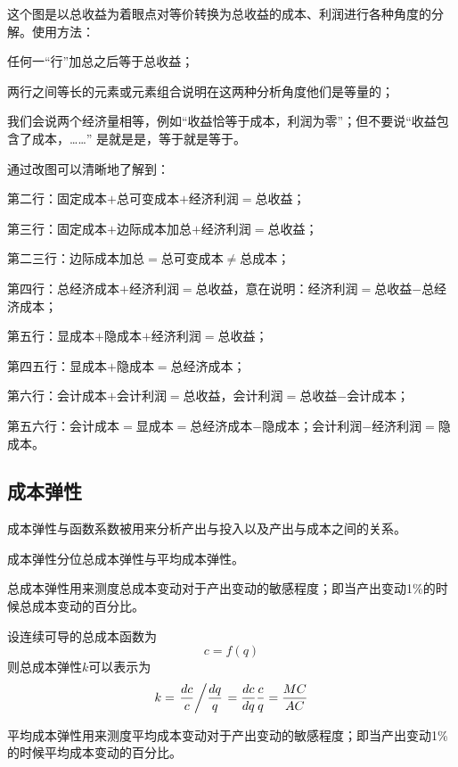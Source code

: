 这个图是以总收益为着眼点对等价转换为总收益的成本、利润进行各种角度的分解。使用方法：
\begin{compactitem}
\item 任何一“行”加总之后等于总收益；
\item 两行之间等长的元素或元素组合说明在这两种分析角度他们是等量的；
\item 我们会说两个经济量相等，例如“收益恰等于成本，利润为零”；但不要说“收益包含了成本，……” 是就是是，等于就是等于。
\end{compactitem}
通过改图可以清晰地了解到：
\begin{compactitem}
\item 第二行：固定成本$+$总可变成本$+$经济利润$=$总收益；
\item 第三行：固定成本$+$边际成本加总$+$经济利润$=$总收益；
\item 第二三行：边际成本加总$=$总可变成本$\ne$总成本；
\item 第四行：总经济成本$+$经济利润$=$总收益，意在说明：经济利润$=$总收益$-$总经济成本；
\item 第五行：显成本$+$隐成本$+$经济利润$=$总收益；
\item 第四五行：显成本$+$隐成本$=$总经济成本；
\item 第六行：会计成本$+$会计利润$=$总收益，会计利润$=$总收益$-$会计成本；
\item 第五六行：会计成本$=$显成本$=$总经济成本$-$隐成本；会计利润$-$经济利润$=$隐成本。
\end{compactitem}


\subsection*{成本弹性}
\label{sec:cost-elasticity}

成本弹性与函数系数被用来分析产出与投入以及产出与成本之间的关系。

成本弹性分位总成本弹性与平均成本弹性。

总成本弹性用来测度总成本变动对于产出变动的敏感程度；即当产出变动1\%的时候总成本变动的百分比。

设连续可导的总成本函数为
\[
c=f(q)
\]
则总成本弹性$k$可以表示为
\begin{equation}
k = \left. {\frac{dc}{c}} \middle/ {\frac{dq}{q}} \right.
  = \frac{dc}{dq} \frac{c}{q} = \frac{MC}{AC}
\label{eq:total-cost-elasticity}
\end{equation}

平均成本弹性用来测度平均成本变动对于产出变动的敏感程度；即当产出变动1\%的时候平均成本变动的百分比。

